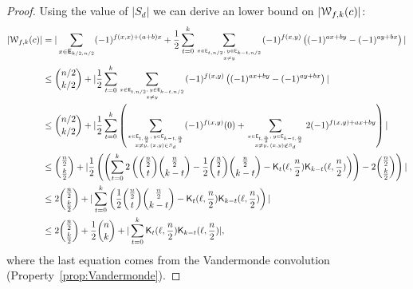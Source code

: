\documentclass[11pt]{llncs}
\begin{document}
\begin{proof}
Using the value of $|S_d|$ we can derive an lower bound on $|\mathcal{W}_{f,k}(c)|$:
\begin{align*}
|\mathcal{W}_{f,k}(c)|&=|\sum_{x\in \mathsf{E}_{k/2,n/2}} (-1)^{f(x,x)+(a+b)x} + \frac{1}{2}
\sum_{t=0}^{k} \sum_{x\in \mathsf{E}_{t,n/2}, \,y\in \mathsf{E}_{k-t,n/2}\atop {x \ne y} }  (-1)^{f(x,y)} \left( (-1)^{a x+ by} - (-1)^{a y+ bx} \right)|\\
&\le \binom{n/2}{k/2} + |\frac{1}{2} 
\sum_{t=0}^{k} \sum_{x\in \mathsf{E}_{t,n/2}, \,y\in \mathsf{E}_{k-t,n/2}\atop {x \ne y} }  (-1)^{f(x,y)} \left( (-1)^{a x+ by} - (-1)^{a y+ bx} \right)|\\
&\le \binom{n/2}{k/2} + |\frac{1}{2}
\sum_{t=0}^{k} \left(\sum_{x\in \mathsf{E}_{t,\frac{n}{2}}, \,y\in \mathsf{E}_{k-t,\frac{n}{2}}\atop {x \ne y, \, (x,y) \in S_d}  }  (-1)^{f(x,y)} (0) 
+  \sum_{x\in \mathsf{E}_{t,\frac{n}{2}}, \,y\in \mathsf{E}_{k-t,\frac{n}{2}}\atop {x \ne y, \, (x,y) \not \in S_d} }  2(-1)^{f(x,y)+a x+ by}   \right)|\\
&\le \binom{\frac{n}{2}}{\frac{k}{2}}+ |\frac{1}{2}\left(
\left(\sum_{t=0}^{k} 2 \left( \binom{\frac{n}{2}}{t} \binom{\frac{n}{2}}{k-t}  - \frac{1}{2} \binom{\frac{n}{2}}{t} \binom{\frac{n}{2}}{k-t}    -   \mathsf{K}_{t}(\ell,\frac{n}{2}) \mathsf{K}_{k-t}(\ell,\frac{n}{2})\right)  \right) - 2\binom{\frac{n}{2}}{\frac{k}{2}} \right) |\\
& \le 2\binom{\frac{n}{2}}{\frac{k}{2}}+ 
|\sum_{t=0}^{k} \left( \frac{1}{2} \binom{\frac{n}{2}}{t} \binom{\frac{n}{2}}{k-t}    -   \mathsf{K}_{t}(\ell,\frac{n}{2}) \mathsf{K}_{k-t}(\ell,\frac{n}{2})\right)|\\
& \le 2\binom{\frac{n}{2}}{\frac{k}{2}}+ \frac{1}{2} \binom{n}{k}+ |\sum_{t=0}^{k} \mathsf{K}_{t}(\ell,\frac{n}{2}) \mathsf{K}_{k-t}(\ell,\frac{n}{2})|,
\end{align*}
where the last equation comes from the Vandermonde convolution (Property~\ref{prop:Vandermonde}).


\end{proof}
\end{document}
